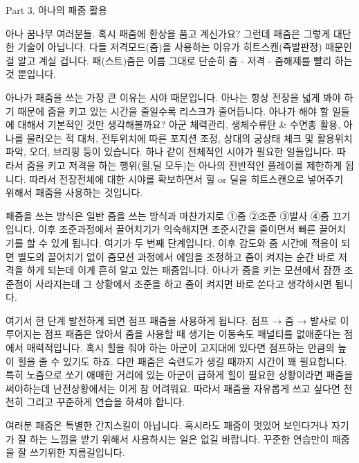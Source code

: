  

Part 3. 아나의 패줌 활용

 

아나 꿈나무 여러분들. 혹시 패줌에 환상을 품고 계신가요? 그런데 패줌은 그렇게 대단한 기술이 아닙니다. 다들 저격모드(줌)을 사용하는 이유가 히트스캔(즉발판정) 때문인 걸 알고 계실 겁니다. 패(스트)줌은 이름 그대로 단순히 줌 - 저격 - 줌해제를 빨리 하는 것 뿐입니다.

 

아나가 패줌을 쓰는 가장 큰 이유는 시야 때문입니다. 아나는 항상 전장을 넓게 봐야 하기 때문에 줌을 키고 있는 시간을 줄일수록 리스크가 줄어듭니다. 아나가 해야 할 일들에 대해서 기본적인 것만 생각해볼까요? 아군 체력관리, 생체수류탄 & 수면총 활용, 아나를 물러오는 적 대처, 전투위치에 따른 포지션 조정, 상대의 궁상태 체크 및 활용위치 파악, 오더, 브리핑 등이 있습니다. 하나 같이 전체적인 시야가 필요한 일들입니다. 따라서 줌을 키고 저격을 하는 행위(힐,딜 모두)는 아나의 전반적인 플레이를 제한하게 됩니다. 따라서 전장전체에 대한 시야를 확보하면서 힐 or 딜을 히트스캔으로 넣어주기 위해서 패줌을 사용하는 것입니다.

 

패줌을 쓰는 방식은 일반 줌을 쓰는 방식과 마찬가지로 ①줌 ②조준 ③발사 ④줌 끄기입니다. 이후 조준과정에서 끌어치기가 익숙해지면 조준시간을 줄이면서 빠른 끌어치기를 할 수 있게 됩니다. 여기가 두 번째 단계입니다. 이후 감도와 줌 시간에 적응이 되면 별도의 끌어치기 없이 줌모션 과정에서 에임을 조정하고 줌이 켜지는 순간 바로 저격을 하게 되는데 이게 흔히 알고 있는 패줌입니다. 아나가 줌을 키는 모션에서 잠깐 조준점이 사라지는데 그 상황에서 조준을 하고 줌이 켜지면 바로 쏜다고 생각하시면 됩니다.

 

여기서 한 단계 발전하게 되면 점프 패줌을 사용하게 됩니다. 점프 → 줌 → 발사로 이루어지는 점프 패줌은 앉아서 줌을 사용할 때 생기는 이동속도 패널티를 없애준다는 점에서 매력적입니다. 혹시 힐을 줘야 하는 아군이 고지대에 있다면 점프하는 만큼의 높이 힐을 줄 수 있기도 하죠. 다만 패줌은 숙련도가 생길 때까지 시간이 꽤 필요합니다. 특히 노줌으로 쏘기 애매한 거리에 있는 아군이 급하게 힐이 필요한 상황이라면 패줌을 써야하는데 난전상황에서는 이게 참 어려워요. 따라서 패줌을 자유롭게 쓰고 싶다면 천천히 그리고 꾸준하게 연습을 하셔야 합니다.

 

여러분 패줌은 특별한 간지스킬이 아닙니다. 혹시라도 패줌이 멋있어 보인다거나 자기가 잘 하는 느낌을 받기 위해서 사용하시는 일은 없길 바랍니다. 꾸준한 연습만이 패줌을 잘 쓰기위한 지름길입니다.

 

